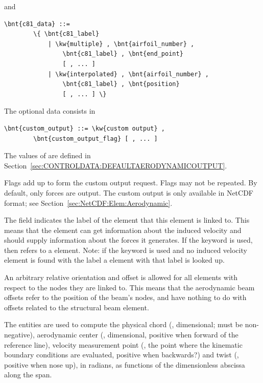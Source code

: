 and
\begin{Verbatim}[commandchars=\\\{\}]
    \bnt{c81_data} ::=
        \{ \bnt{c81_label}
            | \kw{multiple} , \bnt{airfoil_number} ,
                \bnt{c81_label} , \bnt{end_point}
                [ , ... ]
            | \kw{interpolated} , \bnt{airfoil_number} ,
                \bnt{c81_label} , \bnt{position}
                [ , ... ] \}
\end{Verbatim}
The  optional data consists in
\begin{Verbatim}[commandchars=\\\{\}]
    \bnt{custom_output} ::= \kw{custom output} ,
        \bnt{custom_output_flag} [ , ... ]
\end{Verbatim}
The values of 
are defined in Section~\ref{sec:CONTROLDATA:DEFAULTAERODYNAMICOUTPUT}.

Flags add up to form the custom output request.
Flags may not be repeated.
By default, only forces are output.
The custom output is only available in NetCDF format;
see Section~\ref{sec:NetCDF:Elem:Aerodynamic}.

The field  indicates the label
of the  element that this element is linked to.
This means that the element can get information about the
induced velocity and should supply information about the forces it generates.
If the keyword  is used,
then  refers to a  element.
Note: if the keyword  is used
and no induced velocity element is found with the label 
a  element with that label is looked up.

An arbitrary relative orientation and offset is allowed for all elements with
respect to the nodes they are linked to.
This means that the aerodynamic beam offsets refer to the position
of the beam's nodes, and have nothing to do with offsets related
to the structural beam element.

The  entities are used to compute the physical chord (, dimensional; must be non-negative),
aerodynamic center (, dimensional, positive when forward of the reference line), velocity measurement point
(, the point where the kinematic boundary conditions are evaluated, positive when backwards?)
and twist (, positive when nose up), in radians, as functions of the dimensionless abscissa along the span.

